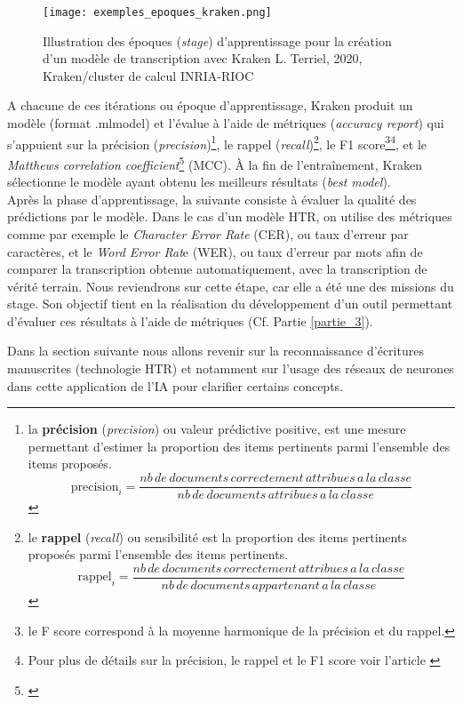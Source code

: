 \begin{figure}[h]
    \centering
    \centerline{\texttt{[image: exemples\_epoques\_kraken.png]}}
    \caption{Illustration des époques (\textit{stage}) d'apprentissage pour la création d'un modèle de transcription avec Kraken \textcopyright L. Terriel, 2020, Kraken/cluster de calcul INRIA-RIOC}
    \label{fig:epoque_kraken_prompt}
\end{figure}
\newpage
A chacune de ces itérations ou époque d'apprentissage, Kraken produit un modèle (format .mlmodel) et l'évalue à l'aide de métriques (\textit{accuracy report}) qui s'appuient sur la précision (\textit{precision})\footnote{la \textbf{précision} (\textit{precision}) ou valeur prédictive positive, est une mesure permettant d'estimer la proportion des items pertinents parmi l'ensemble des items proposés. 
$$ \text{precision}_i = \frac{nb\,de\,documents\,correctement\,attribues\,a\,la\,classe}{nb\,de\,documents\,attribues\,a\,la\,classe} $$}, le rappel (\textit{recall})\footnote{le \textbf{rappel} (\textit{recall}) ou sensibilité est la proportion des items pertinents proposés parmi l'ensemble des items pertinents.
$$ \text{rappel}_i = \frac{nb\,de\,documents\,correctement\,attribues\,a\,la\,classe}{nb\,de\,documents\,appartenant\,a\,la\,classe} $$}, le F1 score\footnote{le F score correspond à la moyenne harmonique de la précision et du rappel.}\footnote{Pour plus de détails sur la précision, le rappel et le F1 score voir l'article \cite{noauthor_precision_2020}}, et le \textit{Matthews correlation coefficient}\footnote{\cite{noauthor_matthews_2020}} (MCC). À la fin de l'entraînement, Kraken sélectionne le modèle ayant obtenu les meilleurs résultats (\textit{best model}).\\

Après la phase d'apprentissage, la suivante consiste à évaluer la qualité des prédictions par le modèle. Dans le cas d'un modèle HTR, on utilise des métriques comme par exemple le \textit{Character Error Rate} (CER), ou taux d'erreur par caractères, et le \textit{Word Error Rat}e (WER), ou taux d'erreur par mots afin de comparer la transcription obtenue automatiquement, avec la transcription de vérité terrain. 
\newpage
Nous reviendrons sur cette étape, car elle a été une des missions du stage. Son objectif tient en la réalisation du développement d'un outil permettant d'évaluer ces résultats à l'aide de métriques (Cf. Partie \ref{partie_3}).

Dans la section suivante nous allons revenir sur la reconnaissance d'écritures manuscrites (technologie HTR) et notamment sur l'usage des réseaux de neurones dans cette application de l'IA pour clarifier certains concepts.

